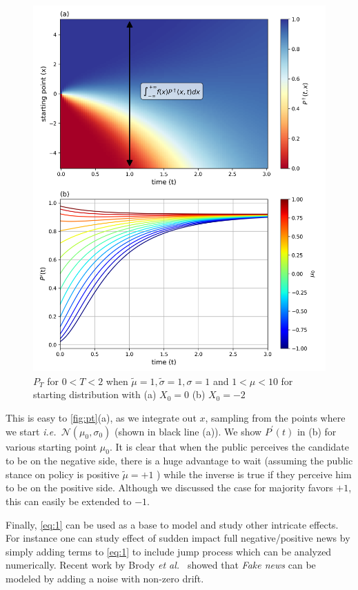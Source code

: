 \documentclass[aps,prl,twocolumn,showpacs,final]{revtex4-1}
\newcommand{\etal}{\textit{et al.\ }}
\newcommand{\ie}{\textit{i.e.\ }}
\newcommand\pN{\mathcal{N}}
\begin{document}
\begin{figure}[!h]
\includegraphics[width=\columnwidth]{Pt.png}
\caption{ $P_T$ for $0<T<2$ when $\tilde{\mu}=1,\tilde{\sigma}=1,\sigma=1$ and $1<\mu<10$ for starting distribution with (a) $X_0=0$ (b) $X_0=-2$ }
\label{fig:pt}
\end{figure}

This is easy to \autoref{fig:pt}(a), as we integrate out $x$, sampling from the points where we start \ie  $\pN(\mu_{0},\sigma_0)$ (shown in black line (a)). We show $P^\prime (t)$ in (b) for various starting point $\mu_0$. It is clear that when the public perceives the candidate to be on the negative side, there is a huge advantage to wait (assuming the public stance on policy is positive $\tilde{\mu}=+1$ ) while the inverse is true if they perceive him to be on the positive side. Although we discussed the case for majority favors $+1$, this can easily be extended to $-1$.

Finally, \eqref{eq:1} can be used as a base to model and study other intricate effects. For instance one can study effect of sudden impact full negative/positive news by simply adding terms to \eqref{eq:1} to include jump process which can be analyzed numerically. Recent work by Brody \etal\cite{brody2018model} showed that \textit{Fake news} can be modeled by adding a noise with non-zero drift. 
\end{document}
